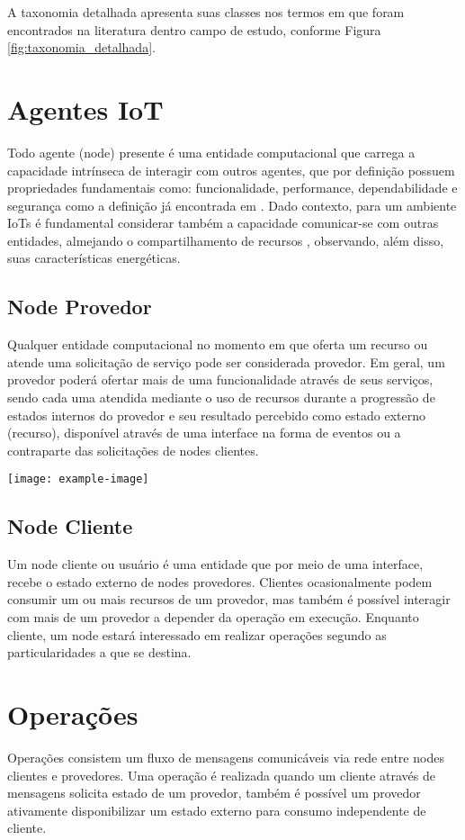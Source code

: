 A taxonomia detalhada apresenta suas classes nos termos em que foram encontrados na literatura dentro campo de estudo, conforme Figura \ref{fig:taxonomia_detalhada}.

\section{Agentes \acs{IoT}}
Todo agente (node) presente é uma entidade computacional que carrega a capacidade intrínseca de interagir com outros agentes, que por definição possuem propriedades fundamentais como: funcionalidade, performance, dependabilidade e segurança como a definição já encontrada em \cite{avizienis_basic_2004}. Dado contexto, para um ambiente \acp{IoT} é fundamental considerar também a capacidade comunicar-se com outras entidades, almejando o compartilhamento de recursos \cite{li_internet_2015}, observando, além disso, suas características energéticas. 


\subsection{Node Provedor}
Qualquer entidade computacional no momento em que oferta um recurso ou atende uma solicitação de serviço pode ser considerada provedor. Em geral, um provedor poderá ofertar mais de uma funcionalidade através de seus serviços, sendo cada uma atendida mediante o uso de recursos durante a progressão de estados internos do provedor e seu resultado percebido como estado externo (recurso), disponível através de uma interface na forma de eventos ou a contraparte das solicitações de nodes clientes.

\noindent\texttt{[image: example-image]} 

\subsection{Node Cliente}
Um node cliente ou usuário é uma entidade que por meio de uma interface, recebe o estado externo de nodes provedores. Clientes ocasionalmente podem consumir um ou mais recursos de um provedor, mas também é possível interagir com mais de um provedor a depender da operação em execução. Enquanto cliente, um node estará interessado em realizar operações segundo as particularidades a que se destina.

\section{Operações}
Operações consistem um fluxo de mensagens comunicáveis via rede entre nodes clientes e provedores. Uma operação é realizada quando um cliente através de mensagens solicita estado de um provedor, também é possível um provedor ativamente disponibilizar um estado externo para consumo independente de cliente. 

